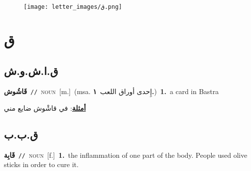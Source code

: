 \documentclass[10pt,a4paper,twoside]{article} %
\begin{document}
\begin{figure*}[t!]\centering\texttt{[image: letter\_images/ق.png]}\end{figure*}
\color{white}

 \section*{\foreignlanguage{arabic}{ق}} 
 \begin{multicols}{2} 

%
\color{black}
\vspace{-3mm}
\subsection*{\color{blue}\foreignlanguage{arabic}{ق.ا.ش.و.ش}\color{blue}{ (ntws)}} 

{\setlength\topsep{0pt}\textbf{\foreignlanguage{arabic}{قَاشُوش}}\ {\color{gray}\texttt{//}\color{black}}\ \textsc{noun}\ [m.]\ \color{gray}(msa. \foreignlanguage{arabic}{إِحدى أوراق اللعب}~\foreignlanguage{arabic}{\textbf{١.}})\color{black}\ \textbf{1.}~a card in Bastra\  \begin{flushright}\color{gray}\foreignlanguage{arabic}{\textbf{\underline{\foreignlanguage{arabic}{أمثلة}}}: في قاشْوش ضايع مني}\end{flushright}\color{black}} \vspace{2mm}

\vspace{-3mm}
\subsection*{\color{blue}\foreignlanguage{arabic}{ق.ب.ب}\color{blue}{}} 

{\setlength\topsep{0pt}\textbf{\foreignlanguage{arabic}{قَابِة}}\ {\color{gray}\texttt{//}\color{black}}\ \textsc{noun}\ [f.]\ \textbf{1.}~the inflammation of one part of the body. People used olive sticks in order to cure it.\ 

}
\end{multicols}
\end{document}
